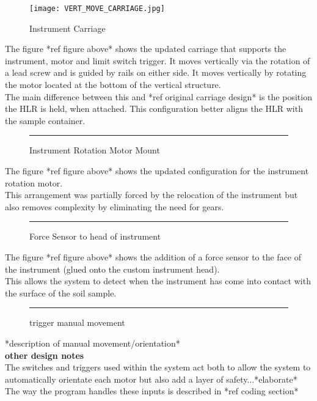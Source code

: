 \documentclass{UoNMCHA}
\numberwithin{equation}{section}
\begin{document}
\begin{figure}[h]
	\centering
	\texttt{[image: VERT\_MOVE\_CARRIAGE.jpg]}
	\caption{Instrument Carriage}
	\label{fig:Instrument Carriage}
\end{figure}
The figure *ref figure above* shows the updated carriage that supports the instrument, motor and limit switch trigger. It moves vertically via the rotation of a lead screw and is guided by rails on either side. It moves vertically by rotating the motor located at the bottom of the vertical structure.\\
The main difference between this and *ref original carriage design* is the position the HLR is held, when attached. This configuration better aligns the HLR with the sample container. \\
\begin{figure}[h]
	\centering
	\rule{0.5\textwidth}{0.5\textwidth}%
	\caption{Instrument Rotation Motor Mount}
	\label{fig:Instrument Rotation Motor Mount}
\end{figure}
The figure *ref figure above* shows the updated configuration for the instrument rotation motor. \\
This arrangement was partially forced by the relocation of the instrument but also removes complexity by eliminating the need for gears. \\
\begin{figure}[h]
	\centering
	\rule{0.5\textwidth}{0.5\textwidth}%
	\caption{Force Sensor to head of instrument}
	\label{fig:Force Sensor to head of instrument}
\end{figure}
The figure *ref figure above* shows the addition of a force sensor to the face of the instrument (glued onto the custom instrument head). \\
This allows the system to detect when the instrument has come into contact with the surface of the soil sample. \\
\begin{figure}[h]
	\centering
	\rule{0.5\textwidth}{0.5\textwidth}%
	\caption{trigger manual movement}
	\label{fig:Manual Movement Trigger}
\end{figure}
*description of manual movement/orientation*\\
\textbf{other design notes}\\
The switches and triggers used within the system act both to allow the system to automatically orientate each motor but also add a layer of safety...*elaborate* \\
The way the program handles these inputs is described in *ref coding section* \\
\end{document}
